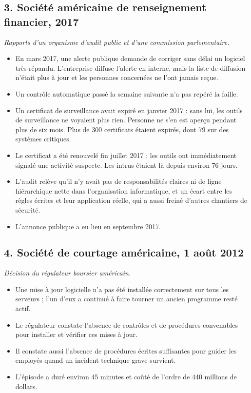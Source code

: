 \documentclass[11pt,a4paper]{article}
\begin{document}
\subsection*{3. Société américaine de renseignement financier, 2017}
\textit{Rapports d'un organisme d'audit public et d'une commission parlementaire.}
\begin{itemize}[itemsep=2pt]
\item En mars 2017, une alerte publique demande de corriger sans délai un logiciel très répandu.
      L'entreprise diffuse l'alerte en interne, mais la liste de diffusion n'était plus à jour et
      les personnes concernées ne l'ont jamais reçue.
\item Un contrôle automatique passé la semaine suivante n'a pas repéré la faille.
\item Un certificat de surveillance avait expiré en janvier 2017 : sans lui, les outils de
      surveillance ne voyaient plus rien. Personne ne s'en est aperçu pendant plus de six mois.
      Plus de 300 certificats étaient expirés, dont 79 sur des systèmes critiques.
\item Le certificat a été renouvelé fin juillet 2017 : les outils ont immédiatement signalé une
      activité suspecte. Les intrus étaient là depuis environ 76 jours.
\item L'audit relève qu'il n'y avait pas de responsabilités claires ni de ligne hiérarchique nette
      dans l'organisation informatique, et un écart entre les règles écrites et leur application
      réelle, qui a aussi freiné d'autres chantiers de sécurité.
\item L'annonce publique a eu lieu en septembre 2017.
\end{itemize}

\subsection*{4. Société de courtage américaine, 1 août 2012}
\textit{Décision du régulateur boursier américain.}
\begin{itemize}[itemsep=2pt]
\item Une mise à jour logicielle n'a pas été installée correctement sur tous les serveurs ; l'un
      d'eux a continué à faire tourner un ancien programme resté actif.
\item Le régulateur constate l'absence de contrôles et de procédures convenables pour installer
      et vérifier ces mises à jour.
\item Il constate aussi l'absence de procédures écrites suffisantes pour guider les employés
      quand un incident technique grave survient.
\item L'épisode a duré environ 45 minutes et coûté de l'ordre de 440 millions de dollars.
\end{itemize}
\end{document}
